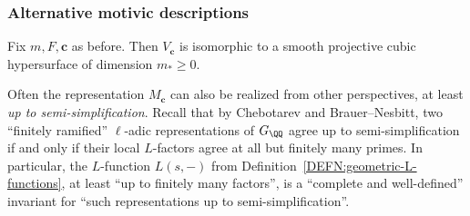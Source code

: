 \documentclass[12pt]{report}
\begin{document}



\subsubsection{Alternative motivic descriptions}

Fix $m,F,\bm{c}$ as before.
Then $V_{\bm{c}}$ is isomorphic to a smooth projective cubic hypersurface of dimension $m_\ast\geq0$.

Often the representation $M_{\bm{c}}$ can also be realized from other perspectives,
at least \emph{up to semi-simplification}.
Recall that by Chebotarev and Brauer--Nesbitt,
two ``finitely ramified'' $\ell$-adic representations of $G_\QQ$ agree up to semi-simplification if and only if their local $L$-factors agree at all but finitely many primes.
In particular,
the $L$-function $L(s,-)$ from Definition~\ref{DEFN:geometric-L-functions},
at least ``up to finitely many factors'',
is a ``complete and well-defined'' invariant for ``such representations up to semi-simplification''.
\end{document}
